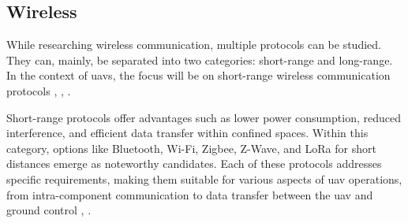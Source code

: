 \subsection{Wireless}
While researching wireless communication, multiple protocols can be studied. They can, mainly, be separated into two categories: short-range and long-range.
In the context of \glspl{uav}, the focus will be on short-range wireless communication protocols \cite{WCOM1}, \cite{WCOM6}, \cite{WCOM7}.

Short-range protocols offer advantages such as lower power consumption, reduced interference, and efficient data transfer within confined spaces.
Within this category, options like Bluetooth, Wi-Fi, Zigbee, Z-Wave, and LoRa for short distances emerge as noteworthy candidates.
Each of these protocols addresses specific requirements, making them suitable for various aspects of \gls{uav} operations, from intra-component communication to data transfer between the \gls{uav} and ground control \cite{WCOM6}, \cite{WCOM7}.

